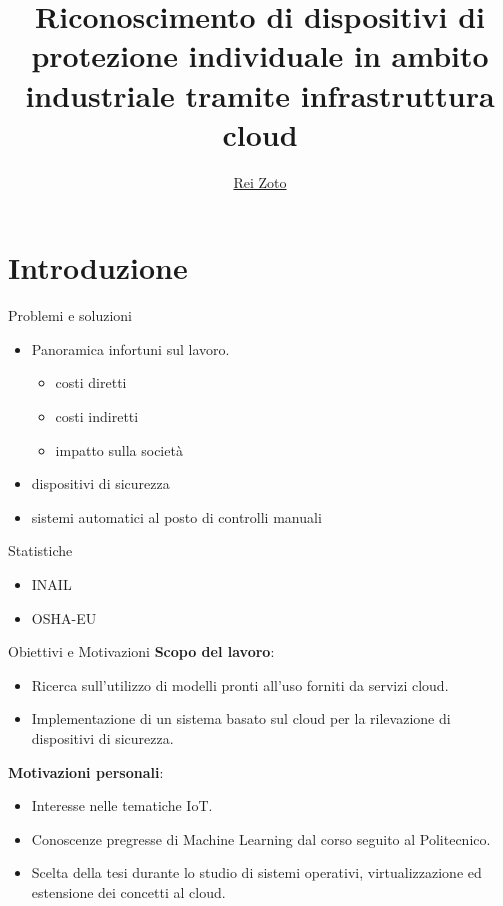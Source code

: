 \documentclass{beamer}
\title{Riconoscimento di dispositivi di
protezione individuale in ambito
industriale tramite infrastruttura
cloud}
\author{\href{mailto:rei.zoto@studenti.polito.it}{Rei Zoto}}
\begin{document}
\maketitle

\section{Introduzione}

\begin{frame}{Problemi e soluzioni}
\begin{itemize}
    \item Panoramica infortuni sul lavoro.
    	\begin{itemize}
    		\item costi diretti
    		\item costi indiretti
    		\item impatto sulla società
    	\end{itemize}	
    \item dispositivi di sicurezza
    \item sistemi automatici al posto di controlli manuali
\end{itemize}
\end{frame}

\begin{frame}{Statistiche}
\begin{itemize}
    \item INAIL
    \item OSHA-EU
\end{itemize}

\end{frame}

\begin{frame}{Obiettivi e Motivazioni}
\textbf{Scopo del lavoro}:
\begin{itemize}
    \item Ricerca sull'utilizzo di modelli pronti all'uso forniti da servizi cloud.
    \item Implementazione di un sistema basato sul cloud per la rilevazione di dispositivi di sicurezza.
\end{itemize}

\textbf{Motivazioni personali}:
\begin{itemize}
    \item Interesse nelle tematiche IoT.
    \item Conoscenze pregresse di Machine Learning dal corso seguito al Politecnico.
    \item Scelta della tesi durante lo studio di sistemi operativi, virtualizzazione ed estensione dei concetti al cloud.
\end{itemize}
\end{frame}
\end{document}
